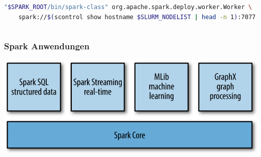 \begin{frame}[fragile]
\begin{columns}
\begin{column}{0.5\linewidth}
\begin{lstlisting}[language=bash,numbers=none,xleftmargin=0pt,linewidth=1.05\linewidth,basicstyle=\scriptsize]
"$SPARK_ROOT/bin/spark-class" org.apache.spark.deploy.worker.Worker \
    spark://$(scontrol show hostname $SLURM_NODELIST | head -n 1):7077
\end{lstlisting}\vspace{-1.5\baselineskip}
    \end{column}\end{columns}
\end{frame}

\begin{frame}
    \frametitle{Spark Anwendungen}
    \centerline{\includegraphics[width=0.8\linewidth]{spark-libraries.png}}

\end{frame}
